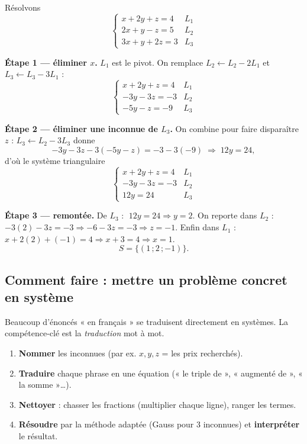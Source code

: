\documentclass[11pt,a4paper]{article}
\begin{document}
\begin{exemple}
Résolvons
\[ \begin{cases} x+2y+z=4 & L_1 \\ 2x+y-z=5 & L_2 \\ 3x+y+2z=3 & L_3 \end{cases} \]

\textbf{Étape 1 — éliminer $x$.} $L_1$ est le pivot. On remplace $L_2\leftarrow L_2-2L_1$ et $L_3\leftarrow L_3-3L_1$ :
\[ \begin{cases} x+2y+z=4 & L_1 \\ -3y-3z=-3 & L_2 \\ -5y-z=-9 & L_3 \end{cases} \]

\textbf{Étape 2 — éliminer une inconnue de $L_3$.} On combine pour faire disparaître $z$ :
$L_3\leftarrow L_2-3L_3$ donne
\[ -3y-3z-3(-5y-z)=-3-3(-9)\;\Longrightarrow\;12y=24, \]
d'où le système triangulaire
\[ \begin{cases} x+2y+z=4 & L_1 \\ -3y-3z=-3 & L_2 \\ 12y=24 & L_3 \end{cases} \]

\textbf{Étape 3 — remontée.} De $L_3$ : $\;12y=24\Rightarrow y=2$. On reporte dans $L_2$ :
$-3(2)-3z=-3\Rightarrow -6-3z=-3\Rightarrow z=-1$. Enfin dans $L_1$ :
$x+2(2)+(-1)=4\Rightarrow x+3=4\Rightarrow x=1$.
\[ \boxed{\,S=\{(1\,;2\,;-1)\}.\,} \]
\end{exemple}

\subsection{Comment faire : mettre un problème concret en système}

Beaucoup d'énoncés « en français » se traduisent directement en systèmes. La compétence-clé est la
\emph{traduction} mot à mot.

\begin{commentfaire}
\begin{enumerate}[leftmargin=2em,topsep=2pt,itemsep=2pt]
  \item \textbf{Nommer} les inconnues (par ex. $x,y,z$ = les prix recherchés).
  \item \textbf{Traduire} chaque phrase en une équation (« le triple de », « augmenté de », « la somme »\dots).
  \item \textbf{Nettoyer} : chasser les fractions (multiplier chaque ligne), ranger les termes.
  \item \textbf{Résoudre} par la méthode adaptée (Gauss pour 3 inconnues) et \textbf{interpréter} le résultat.
\end{enumerate}
\end{commentfaire}
\end{document}

